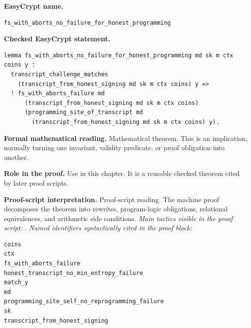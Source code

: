 \begin{formaltheorem}
\noindent\textbf{EasyCrypt name.}
\begin{lstlisting}[language=EasyCrypt,basicstyle=\ttfamily\scriptsize]
fs_with_aborts_no_failure_for_honest_programming
\end{lstlisting}
\noindent\textbf{Checked EasyCrypt statement.}
\begin{lstlisting}[language=EasyCrypt,basicstyle=\ttfamily\scriptsize]
lemma fs_with_aborts_no_failure_for_honest_programming md sk m ctx coins y :
  transcript_challenge_matches
    (transcript_from_honest_signing md sk m ctx coins) y =>
  ! fs_with_aborts_failure md
      (transcript_from_honest_signing md sk m ctx coins)
      (programming_site_of_transcript md
        (transcript_from_honest_signing md sk m ctx coins) y).
\end{lstlisting}
\noindent\textbf{Formal mathematical reading.}
Mathematical theorem. This is an implication, normally turning one invariant, validity predicate, or proof obligation into another.

\noindent\textbf{Role in the proof.}
Use in this chapter. It is a reusable checked theorem cited by later proof scripts.

\noindent\textbf{Proof-script interpretation.}
Proof-script reading. The machine proof decomposes the theorem into rewrites, program-logic obligations, relational equivalences, and arithmetic side conditions.
\emph{Main tactics visible in the proof script:} .
\emph{Named identifiers syntactically cited in the proof block:}
\begin{lstlisting}[language=EasyCrypt,basicstyle=\ttfamily\scriptsize]
coins
ctx
fs_with_aborts_failure
honest_transcript_no_min_entropy_failure
match_y
md
programming_site_self_no_reprogramming_failure
sk
transcript_from_honest_signing
\end{lstlisting}

\end{formaltheorem}

